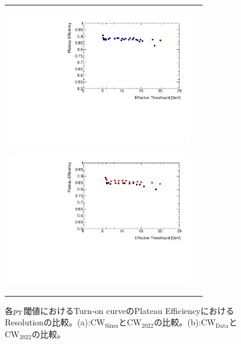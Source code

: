 \begin{figure}
    \begin{tabular}{cc}
    \centering
    \begin{minipage}[b]{0.45\hsize}%
        \centering
        \hspace*{-1.5cm}
        \includegraphics[clip, width=8cm]{fig/4/v05vsv07_Plateau.pdf}
        \subcaption{}
        \label{fig:Plateau_v07v05}
    \end{minipage}%
    \begin{minipage}[b]{0.7\hsize}%
        \centering
        \hspace*{-0.75cm}
        \includegraphics[clip, width=8cm]{fig/4/v05vsv06_Plateau.pdf}
        \subcaption{}
        \label{fig:Plateau_v06v05}
    \end{minipage}%
    \end{tabular}
    \caption{各$p_{\rm{T}}$閾値におけるTurn-on curveのPlateau EfficiencyにおけるResolutionの比較。(a):$\mathrm{CW_{Simu}}$と$\mathrm{CW_{2022}}$の比較。(b):$\mathrm{CW_{Data}}$と$\mathrm{CW_{2022}}$の比較。}
    \label{fig:Resolution_v07v06v05}
\end{figure}

